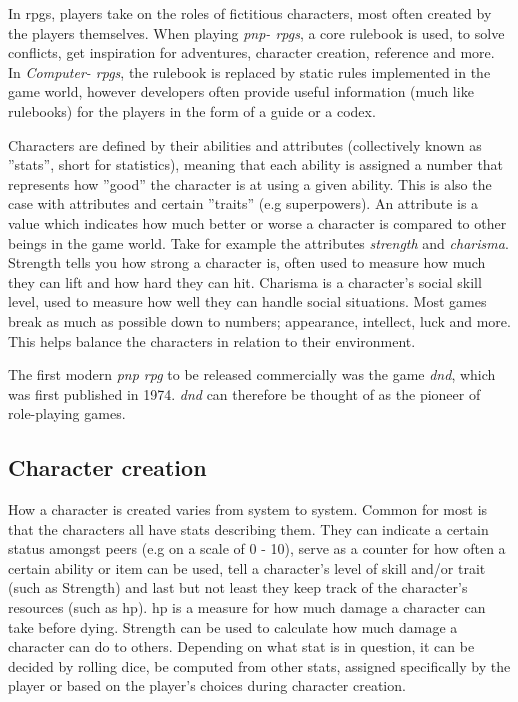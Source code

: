 In \ac{rpgs}, players take on the roles of fictitious characters, most often created by the players themselves.
When playing \emph{\ac{pnp}- \ac{rpgs}}, a core rulebook is used, to solve conflicts, get inspiration for adventures, character creation, reference and more. In \emph{Computer- \ac{rpgs}}, the rulebook is replaced by static rules implemented in the game world, however developers often provide useful information (much like rulebooks) for the players in the form of a guide or a codex.

Characters are defined by their abilities and attributes (collectively known as ''stats'', short for statistics), meaning that each ability is assigned a number that represents how ''good'' the character is at using a given ability. This is also the case with attributes and certain ''traits'' (e.g superpowers). An attribute is a value which indicates how much better or worse a character is compared to other beings in the game world. Take for example the attributes \emph{strength} and \emph{charisma}. Strength tells you how strong a character is, often used to measure how much they can lift and how hard they can hit. Charisma is a character's social skill level, used to measure how well they can handle social situations. Most games break as much as possible down to numbers; appearance, intellect, luck and more. This helps balance the characters in relation to their environment.

The first modern \emph{\ac{pnp} \ac{rpg}} to be released commercially was the game \emph{\ac{dnd}}, which was first published in 1974.\cite{wikidnd}
\emph{\ac{dnd}} can therefore be thought of as the pioneer of role-playing games.

\subsection{Character creation}
How a character is created varies from system to system. Common for most is that the characters all have stats describing them.
They can indicate a certain status amongst peers (e.g on a scale of 0 - 10), serve as a counter for how often a certain ability or item can be used, tell a character's level of skill and/or trait (such as Strength) and last but not least they keep track of the character's resources (such as \ac{hp}).
\ac{hp} is a measure for how much damage a character can take before dying. Strength can be used to calculate how much damage a character can do to others. Depending on what stat is in question, it can be decided by rolling dice, be computed from other stats, assigned specifically by the player or based on the player's choices during character creation.

